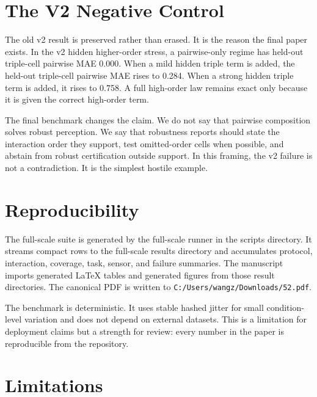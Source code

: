 \documentclass{article}
\begin{document}
\section{The V2 Negative Control}

The old v2 result is preserved rather than erased. It is the reason the final paper exists. In the v2 hidden higher-order stress, a pairwise-only regime has held-out triple-cell pairwise MAE 0.000. When a mild hidden triple term is added, the held-out triple-cell pairwise MAE rises to 0.284. When a strong hidden triple term is added, it rises to 0.758. A full high-order law remains exact only because it is given the correct high-order term.

\begin{table}[t]
\centering
\small

\caption{V2 hidden higher-order stress. This negative control shows why the final paper cannot claim universal pairwise sufficiency.}
\label{tab:v2}
\end{table}

The final benchmark changes the claim. We do not say that pairwise composition solves robust perception. We say that robustness reports should state the interaction order they support, test omitted-order cells when possible, and abstain from robust certification outside support. In this framing, the v2 failure is not a contradiction. It is the simplest hostile example.

\section{Reproducibility}

The full-scale suite is generated by the full-scale runner in the scripts directory. It streams compact rows to the full-scale results directory and accumulates protocol, interaction, coverage, task, sensor, and failure summaries. The manuscript imports generated LaTeX tables and generated figures from those result directories. The canonical PDF is written to \texttt{C:/Users/wangz/Downloads/52.pdf}.

The benchmark is deterministic. It uses stable hashed jitter for small condition-level variation and does not depend on external datasets. This is a limitation for deployment claims but a strength for review: every number in the paper is reproducible from the repository.

\section{Limitations}
\end{document}
